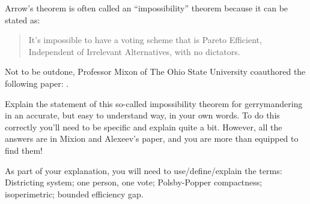 \documentclass[nooutcomes,noauthor,hints,handout,12pt]{ximera}
\begin{document}
\begin{question}
  Arrow's theorem is often called an ``impossibility'' theorem because it
  can be stated as:
  \begin{quote}
    It's impossible to have a voting scheme that is Pareto Efficient,
    Independent of Irrelevant Alternatives, with no dictators.
  \end{quote}
  Not to be outdone, Professor Mixon of The Ohio State University
  coauthored the following paper: .


  Explain the statement of this so-called impossibility theorem for
  gerrymandering in an accurate, but easy to understand way, in your
  own words. To do this correctly you'll need to be specific and
  explain quite a bit. However, all the answers are in Mixion and
  Alexeev's paper, and you are more than equipped to find them!
  \begin{hint}
    As part of your explanation, you will need to use/define/explain
    the terms: Districting system; one person, one vote; Polsby-Popper
    compactness; isoperimetric; bounded efficiency gap.
  \end{hint}
\end{question}
\end{document}
